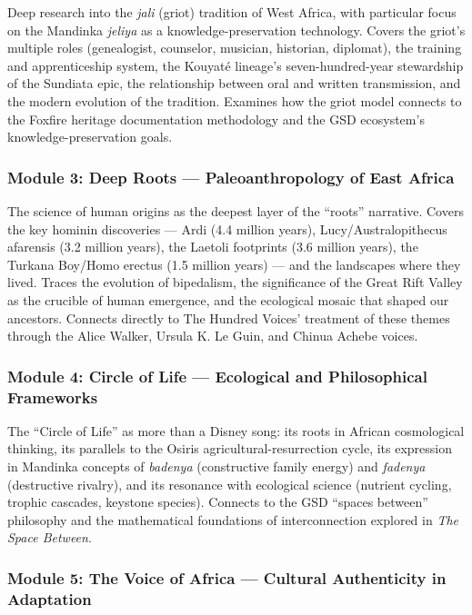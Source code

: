 \documentclass[11pt,letterpaper]{article}
\begin{document}
Deep research into the \textit{jali} (griot) tradition of West Africa, with particular focus on the Mandinka \textit{jeliya} as a knowledge-preservation technology. Covers the griot's multiple roles (genealogist, counselor, musician, historian, diplomat), the training and apprenticeship system, the Kouyat\'{e} lineage's seven-hundred-year stewardship of the Sundiata epic, the relationship between oral and written transmission, and the modern evolution of the tradition. Examines how the griot model connects to the Foxfire heritage documentation methodology and the GSD ecosystem's knowledge-preservation goals.

\subsubsection{Module 3: Deep Roots --- Paleoanthropology of East Africa}

The science of human origins as the deepest layer of the ``roots'' narrative. Covers the key hominin discoveries --- Ardi (4.4 million years), Lucy/Australopithecus afarensis (3.2 million years), the Laetoli footprints (3.6 million years), the Turkana Boy/Homo erectus (1.5 million years) --- and the landscapes where they lived. Traces the evolution of bipedalism, the significance of the Great Rift Valley as the crucible of human emergence, and the ecological mosaic that shaped our ancestors. Connects directly to The Hundred Voices' treatment of these themes through the Alice Walker, Ursula K. Le Guin, and Chinua Achebe voices.

\subsubsection{Module 4: Circle of Life --- Ecological and Philosophical Frameworks}

The ``Circle of Life'' as more than a Disney song: its roots in African cosmological thinking, its parallels to the Osiris agricultural-resurrection cycle, its expression in Mandinka concepts of \textit{badenya} (constructive family energy) and \textit{fadenya} (destructive rivalry), and its resonance with ecological science (nutrient cycling, trophic cascades, keystone species). Connects to the GSD ``spaces between'' philosophy and the mathematical foundations of interconnection explored in \textit{The Space Between}.

\subsubsection{Module 5: The Voice of Africa --- Cultural Authenticity in Adaptation}
\end{document}
